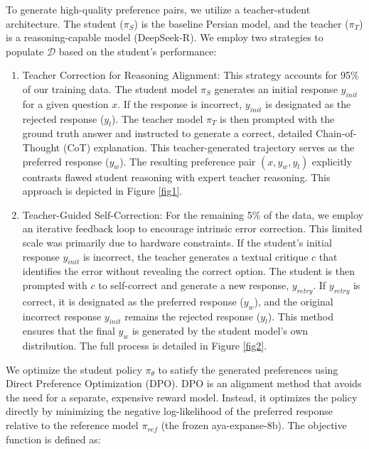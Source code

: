 \documentclass[conference]{IEEEtran}
\begin{document}
To generate high-quality preference pairs, we utilize a teacher-student architecture. The student ($\pi_S$) is the baseline Persian model, and the teacher ($\pi_T$) is a reasoning-capable model (DeepSeek-R). We employ two strategies to populate $\mathcal{D}$ based on the student's performance:
\begin{enumerate}
	\item Teacher Correction for Reasoning Alignment:
	This strategy accounts for 95\% of our training data. The student model $\pi_S$ generates an initial response $y_{init}$ for a given question $x$. If the response is incorrect, $y_{init}$ is designated as the rejected response ($y_l$). The teacher model $\pi_T$ is then prompted with the ground truth answer and instructed to generate a correct, detailed Chain-of-Thought (CoT) explanation. This teacher-generated trajectory serves as the preferred response ($y_w$). The resulting preference pair $(x, y_w, y_l)$ explicitly contrasts flawed student reasoning with expert teacher reasoning. This approach is depicted in Figure \ref{fig1}.
	
	\item Teacher-Guided Self-Correction:
	For the remaining 5\% of the data, we employ an iterative feedback loop to encourage intrinsic error correction. This limited scale was primarily due to hardware constraints. If the student's initial response $y_{init}$ is incorrect, the teacher generates a textual critique $c$ that identifies the error without revealing the correct option. The student is then prompted with $c$ to self-correct and generate a new response, $y_{retry}$. If $y_{retry}$ is correct, it is designated as the preferred response ($y_w$), and the original incorrect response $y_{init}$ remains the rejected response ($y_l$). This method ensures that the final $y_w$ is generated by the student model's own distribution. The full process is detailed in Figure \ref{fig2}.
\end{enumerate}

We optimize the student policy $\pi_{\theta}$ to satisfy the generated preferences using Direct Preference Optimization (DPO). DPO is an alignment method that avoids the need for a separate, expensive reward model. Instead, it optimizes the policy directly by minimizing the negative log-likelihood of the preferred response relative to the reference model $\pi_{ref}$ (the frozen aya-expanse-8b). The objective function is defined as:

\end{document}
